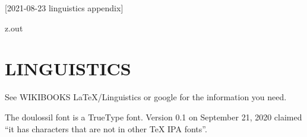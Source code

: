 [2021-08-23 linguistics appendix]

\begin{VerbatimOut}{z.out}
\chapter{LINGUISTICS}

See WIKIBOOKS \LaTeX/Linguistics \cite{wikibooks-latex-linguistics}
or google for the information you need.

The doulossil font \cite{tambe2020}
is a TrueType font.
Version 0.1 on September 21, 2020 claimed
``it has characters that are not in other TeX IPA fonts''.
\end{VerbatimOut}

\MyIO
